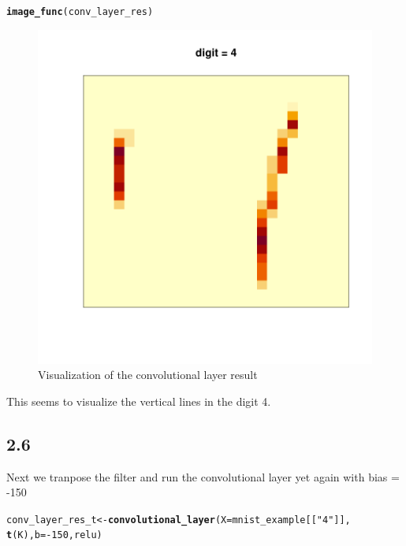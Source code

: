 \documentclass[10pt, a4paper, english]{article}\usepackage[]{graphicx}\usepackage[dvipsnames]{xcolor}
\makeatletter
\def\maxwidth{ %
  \ifdim\Gin@nat@width>\linewidth
    \linewidth
  \else
    \Gin@nat@width
  \fi
}
\newcommand{\hlnum}[1]{\textcolor[rgb]{0.686,0.059,0.569}{#1}}%
\newcommand{\hlstr}[1]{\textcolor[rgb]{0.192,0.494,0.8}{#1}}%
\newcommand{\hlopt}[1]{\textcolor[rgb]{0,0,0}{#1}}%
\newcommand{\hlstd}[1]{\textcolor[rgb]{0.345,0.345,0.345}{#1}}%
\newcommand{\hlkwb}[1]{\textcolor[rgb]{0.69,0.353,0.396}{#1}}%
\newcommand{\hlkwc}[1]{\textcolor[rgb]{0.333,0.667,0.333}{#1}}%
\newcommand{\hlkwd}[1]{\textcolor[rgb]{0.737,0.353,0.396}{\textbf{#1}}}%
\newenvironment{kframe}{%
 \def\at@end@of@kframe{}%
 \ifinner\ifhmode%
  \def\at@end@of@kframe{\end{minipage}}%
  \begin{minipage}{\columnwidth}%
 \fi\fi%
 \def\FrameCommand##1{\hskip\@totalleftmargin \hskip-\fboxsep
 \colorbox{shadecolor}{##1}\hskip-\fboxsep
     \hskip-\linewidth \hskip-\@totalleftmargin \hskip\columnwidth}%
 \MakeFramed {\advance\hsize-\width
   \@totalleftmargin\z@ \linewidth\hsize
   \@setminipage}}%
 {\par\unskip\endMakeFramed%
 \at@end@of@kframe}
\newenvironment{knitrout}{}{} %
\makeatother
\begin{document}
\begin{knitrout}
\color{fgcolor}\begin{kframe}
\begin{alltt}
\hlkwd{image_func}\hlstd{(conv_layer_res)}
\end{alltt}
\end{kframe}\begin{figure}
\includegraphics[width=\maxwidth]{figure/unnamed-chunk-38-1} \caption[Visualization of the convolutional layer result]{Visualization of the convolutional layer result}\label{fig:unnamed-chunk-38}
\end{figure}

\end{knitrout}

This seems to visualize the vertical lines in the digit 4.
\subsection{2.6}
Next we tranpose the filter and run the convolutional layer yet again with bias = -150

\begin{knitrout}
\color{fgcolor}\begin{kframe}
\begin{alltt}
\hlstd{conv_layer_res_t} \hlkwb{<-} \hlkwd{convolutional_layer}\hlstd{(}\hlkwc{X}\hlstd{= mnist_example[[}\hlstr{"4"}\hlstd{]],}
                                        \hlkwd{t}\hlstd{(K),} \hlkwc{b}\hlstd{=} \hlopt{-}\hlnum{150}\hlstd{, relu)}
\end{alltt}
\end{kframe}
\end{knitrout}
\end{document}
